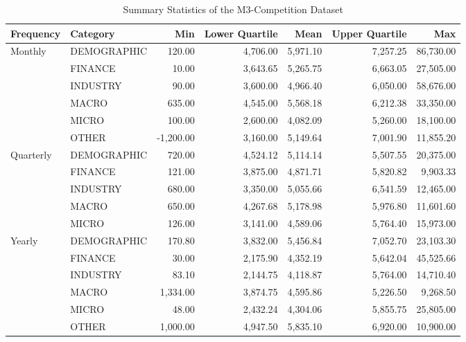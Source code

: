 \documentclass[12pt,a4paper]{article}
\begin{document}
\begin{table}[htbp]
  \centering
  \caption{Summary Statistics of the M3-Competition Dataset}
  \label{summary_statistics}
  \small %
  \setlength{\tabcolsep}{4pt} %
  \begin{tabular}{llrrrrr}
  \toprule
  \textbf{Frequency} & \textbf{Category} & \textbf{Min} & \textbf{Lower Quartile} & \textbf{Mean} & \textbf{Upper Quartile} & \textbf{Max} \\
  \midrule
  \multirow{6}{*}{Monthly} & DEMOGRAPHIC & 120.00 & 4,706.00 & 5,971.10 & 7,257.25 & 86,730.00 \\
                           & FINANCE     & 10.00  & 3,643.65 & 5,265.75 & 6,663.05 & 27,505.00 \\
                           & INDUSTRY    & 90.00  & 3,600.00 & 4,966.40 & 6,050.00 & 58,676.00 \\
                           & MACRO       & 635.00 & 4,545.00 & 5,568.18 & 6,212.38 & 33,350.00 \\
                           & MICRO       & 100.00 & 2,600.00 & 4,082.09 & 5,260.00 & 18,100.00 \\
                           & OTHER       & -1,200.00 & 3,160.00 & 5,149.64 & 7,001.90 & 11,855.20 \\
  \midrule
  \multirow{5}{*}{Quarterly} & DEMOGRAPHIC & 720.00 & 4,524.12 & 5,114.14 & 5,507.55 & 20,375.00 \\
                             & FINANCE     & 121.00 & 3,875.00 & 4,871.71 & 5,820.82 & 9,903.33 \\
                             & INDUSTRY    & 680.00 & 3,350.00 & 5,055.66 & 6,541.59 & 12,465.00 \\
                             & MACRO       & 650.00 & 4,267.68 & 5,178.98 & 5,976.80 & 11,601.60 \\
                             & MICRO       & 126.00 & 3,141.00 & 4,589.06 & 5,764.40 & 15,973.00 \\
  \midrule
  \multirow{6}{*}{Yearly} & DEMOGRAPHIC & 170.80 & 3,832.00 & 5,456.84 & 7,052.70 & 23,103.30 \\
                          & FINANCE     & 30.00  & 2,175.90 & 4,352.19 & 5,642.04 & 45,525.66 \\
                          & INDUSTRY    & 83.10  & 2,144.75 & 4,118.87 & 5,764.00 & 14,710.40 \\
                          & MACRO       & 1,334.00 & 3,874.75 & 4,595.86 & 5,226.50 & 9,268.50 \\
                          & MICRO       & 48.00  & 2,432.24 & 4,304.06 & 5,855.75 & 25,805.00 \\
                          & OTHER       & 1,000.00 & 4,947.50 & 5,835.10 & 6,920.00 & 10,900.00 \\
  \bottomrule
  \end{tabular}
\end{table}
\end{document}
